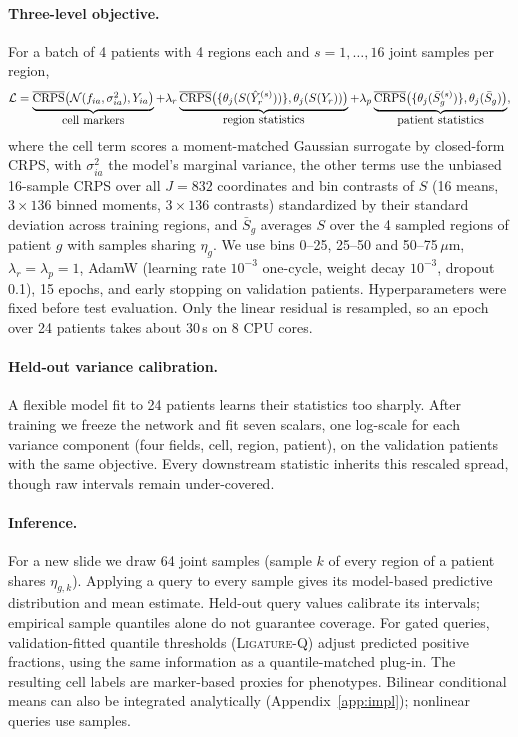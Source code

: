 \documentclass[10pt,letterpaper]{article}
\theoremstyle{definition}
\theoremstyle{remark}
\newcommand{\method}{\textnormal{\textsc{Ligature}}}
\begin{document}
\paragraph{Three-level objective.} For a batch of 4 patients with 4 regions each and $s=1,\dots,16$ joint samples per region,
\begin{equation}
\mathcal{L}=\underbrace{\overline{\mathrm{CRPS}}\big(\mathcal{N}(f_{ia},\textstyle\sigma_{ia}^2),Y_{ia}\big)}_{\text{\normalsize cell markers}}
+\lambda_r\underbrace{\overline{\mathrm{CRPS}}\big(\{\theta_j(S(\hat Y^{(s)}_r))\},\theta_j(S(Y_r))\big)}_{\text{\normalsize region statistics}}
+\lambda_p\underbrace{\overline{\mathrm{CRPS}}\big(\{\theta_j(\bar S^{(s)}_g)\},\theta_j(\bar S_g)\big)}_{\text{\normalsize patient statistics}},
\end{equation}
where the cell term scores a moment-matched Gaussian surrogate by closed-form CRPS, with $\sigma_{ia}^2$ the model's marginal variance, the other terms use the unbiased 16-sample CRPS over all $J=832$ coordinates and bin contrasts of $S$ (16 means, $3\times136$ binned moments, $3\times136$ contrasts) standardized by their standard deviation across training regions, and $\bar S_g$ averages $S$ over the 4 sampled regions of patient $g$ with samples sharing $\eta_g$. We use bins 0--25, 25--50 and 50--75\,$\mu$m, $\lambda_r=\lambda_p=1$, AdamW (learning rate $10^{-3}$ one-cycle, weight decay $10^{-3}$, dropout 0.1), 15 epochs, and early stopping on validation patients. Hyperparameters were fixed before test evaluation. Only the linear residual is resampled, so an epoch over 24 patients takes about 30\,s on 8 CPU cores.

\paragraph{Held-out variance calibration.} A flexible model fit to 24 patients learns their statistics too sharply. After training we freeze the network and fit seven scalars, one log-scale for each variance component (four fields, cell, region, patient), on the validation patients with the same objective. Every downstream statistic inherits this rescaled spread, though raw intervals remain under-covered.

\paragraph{Inference.} For a new slide we draw 64 joint samples (sample $k$ of every region of a patient shares $\eta_{g,k}$). Applying a query to every sample gives its model-based predictive distribution and mean estimate. Held-out query values calibrate its intervals; empirical sample quantiles alone do not guarantee coverage. For gated queries, validation-fitted quantile thresholds (\method{}-Q) adjust predicted positive fractions, using the same information as a quantile-matched plug-in. The resulting cell labels are marker-based proxies for phenotypes.
Bilinear conditional means can also be integrated analytically (Appendix~\ref{app:impl}); nonlinear queries use samples.
\end{document}
